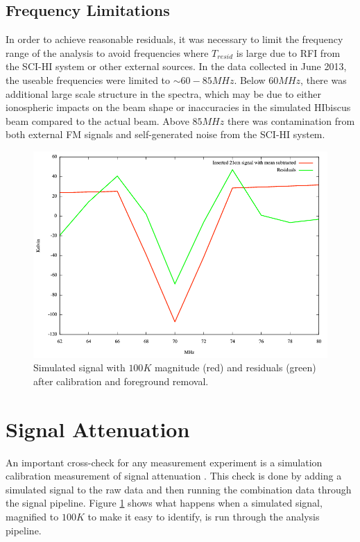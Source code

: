 \subsection{Frequency Limitations}

In order to achieve reasonable residuals, it was necessary to limit the frequency range of the analysis to avoid frequencies where $T_{resid}$ is large due to RFI from the SCI-HI system or other external sources. In the data collected in June 2013, the useable frequencies were limited to $\sim 60-85 MHz$. Below $60 MHz$, there was additional large scale structure in the spectra, which may be due to either ionospheric impacts on the beam shape or inaccuracies in the simulated HIbiscus beam compared to the actual beam. Above $85 MHz$ there was contamination from both external FM signals and self-generated noise from the SCI-HI system. 

\begin{figure}[htb]
\begin{center}
\includegraphics[width=0.9\linewidth]{Data_analysis/figures/100_K_21cm_signal.png}
\caption{Simulated \cm signal with $100 K$ magnitude (red) and residuals (green) after calibration and foreground removal. }
\label{Fig:100K_sim}
\end{center}
\end{figure}



\section{\cm Signal Attenuation}

An important cross-check for any \cm measurement experiment is a simulation calibration measurement of signal attenuation \cite{paciga_2013}. This check is done by adding a simulated \cm signal to the raw data and then running the combination data through the signal pipeline. Figure \ref{Fig:100K_sim} shows what happens when a simulated \cm signal, magnified to $100 K$ to make it easy to identify, is run through the analysis pipeline. 


